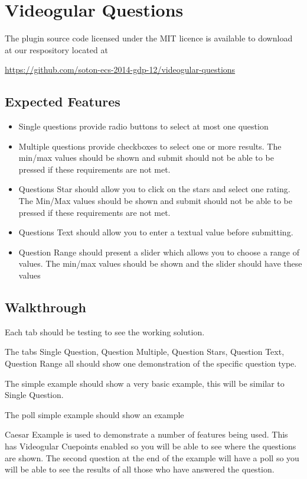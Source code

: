 \documentclass[12pt,a4paper]{article}
\begin{document}
\section*{Videogular Questions}

The plugin source code licensed under the MIT licence is available to download at our respository located at 

\url{https://github.com/soton-ecs-2014-gdp-12/videogular-questions}

\subsection*{Expected Features}

\begin{itemize}
\item Single questions provide radio buttons to select at most one question
\item Multiple questions provide checkboxes to select one or more results. The min/max values should be shown and submit should not be able to be pressed if these requirements are not met.
\item Questions Star should allow you to click on the stars and select one rating. The Min/Max values should be shown and submit should not be able to be pressed if these requirements are not met.
\item Questions Text should allow you to enter a textual value before submitting.
\item Question Range should present a slider which allows you to choose a range of values. The min/max values should be shown and the slider should have these values
\end{itemize}

\subsection*{Walkthrough}

Each tab should be testing to see the working solution.

The tabs Single Question, Question Multiple, Question Stars, Question Text, Question Range all should show one demonstration of the specific question type.

The simple example should show a very basic example, this will be similar to Single Question.

The poll simple example should show an example 

Caesar Example is used to demonstrate a number of features being used. This has Videogular Cuepoints enabled so you will be able to see where the questions are shown. The second question at the end of the example will have a poll so you will be able to see the results of all those who have answered the question.
\end{document}
